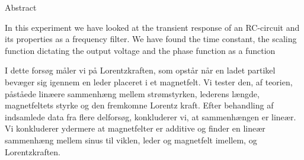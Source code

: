 \documentclass[../main/main.tex]{subfiles}
\begin{document}
\begin{dualabstract}{Abstract}

In this experiment we have looked at the transient response of an RC-circuit and its properties as a frequency filter.
We have found the time constant, the scaling function dictating the output voltage and the phase function as a function 

I dette forsøg måler vi på Lorentzkraften, som opstår når en ladet partikel bevæger sig igennem en leder placeret i et magnetfelt.
Vi tester den, af teorien, påståede linæere sammenhæng mellem strømstyrken, lederens længde, magnetfeltets styrke og den fremkomne Lorentz kraft.
Efter behandling af indsamlede data fra flere delforsøg, konkluderer vi, at sammenhængen er lineær.
Vi konkluderer ydermere at magnetfelter er additive og finder en lineær sammenhæng mellem sinus til viklen, leder og magnetfelt imellem, og Lorentzkraften.

\end{dualabstract}


\begin{dualabstract}

\end{dualabstract}

\printbibliography{}
\end{document}
